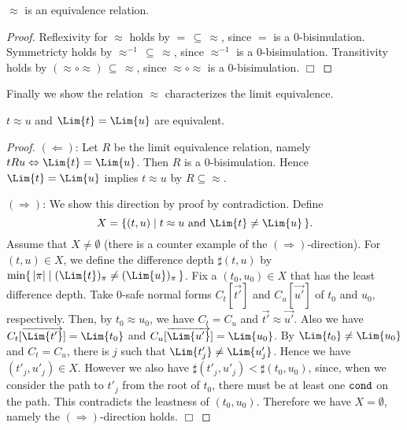 \begin{lemma}
  $\approx$ is an equivalence relation.
\end{lemma}
\begin{proof}
  Reflexivity for $\approx$ holds by $=\,\subseteq\,\approx$, since $=$ is a $0$-bisimulation.
  Symmetricty holds by $\approx^{-1}\,\subseteq\,\approx$, since $\approx^{-1}$ is a $0$-bisimulation.
  Transitivity holds by $(\approx\circ\approx)\,\subseteq\,\approx$, since $\approx\circ\approx$ is a $0$-bisimulation.
  \hfill$\Box$
\end{proof}

Finally we show the relation $\approx$ characterizes the limit equivalence. 
\begin{proposition}
  $t \approx u$ and $\Lim{t} = \Lim{u}$ are equivalent. 
\end{proposition}
\begin{proof}
  $(\Leftarrow)$: Let $R$ be the limit equivalence relation, namely $tRu \Leftrightarrow \Lim{t}=\Lim{u}$. 
  Then $R$ is a $0$-bisimulation.
  Hence $\Lim{t} = \Lim{u}$ implies $t \approx u$ by $R \subseteq \approx$. 
  
  $(\Rightarrow)$:
  We show this direction by proof by contradiction.
  Define
  \[
  X = \{(t,u) \mid \text{$t \approx u$ and $\Lim{t} \neq \Lim{u}$}\,\}.
  \]
  Assume that $X \neq \emptyset$ (there is a counter example of the $(\Rightarrow)$-direction). 
  For $(t,u)\in X$, we define the difference depth $\sharp(t,u)$
  by $\min\{\,|\pi| \mid (\Lim{t})_{\pi} \neq (\Lim{u})_{\pi}\,\}$. 
  Fix a $(t_0,u_0) \in X$ that has the least difference depth.
  Take $0$-safe normal forms $C_t[\vec{t'}]$ and $C_u[\vec{u'}]$ of $t_0$ and $u_0$, respectively. 
  Then, by $t_0\approx u_0$, we have $C_t = C_u$ and $\vec{t'} \approx \vec{u'}$. 
  Also we have $C_t[\overrightarrow{\Lim{t'}}] = \Lim{t_0}$ and $C_u[\overrightarrow{\Lim{u'}}] = \Lim{u_0}$. 
  By $\Lim{t_0}\neq \Lim{u_0}$ and $C_t=C_u$,
  there is $j$ such that $\Lim{t'_j} \neq \Lim{u'_j}$. 
  Hence we have $(t'_j,u'_j) \in X$. 
  However we also have $\sharp(t'_j,u'_j) < \sharp(t_0,u_0)$,
  since, when we consider the path to $t'_j$ from the root of $t_0$,
  there must be at least one ${\tt cond}$ on the path.
  This contradicts the leastness of $(t_0,u_0)$.
  Therefore we have $X = \emptyset$, namely the $(\Rightarrow)$-direction holds.
  \hfill$\Box$
\end{proof}
  

